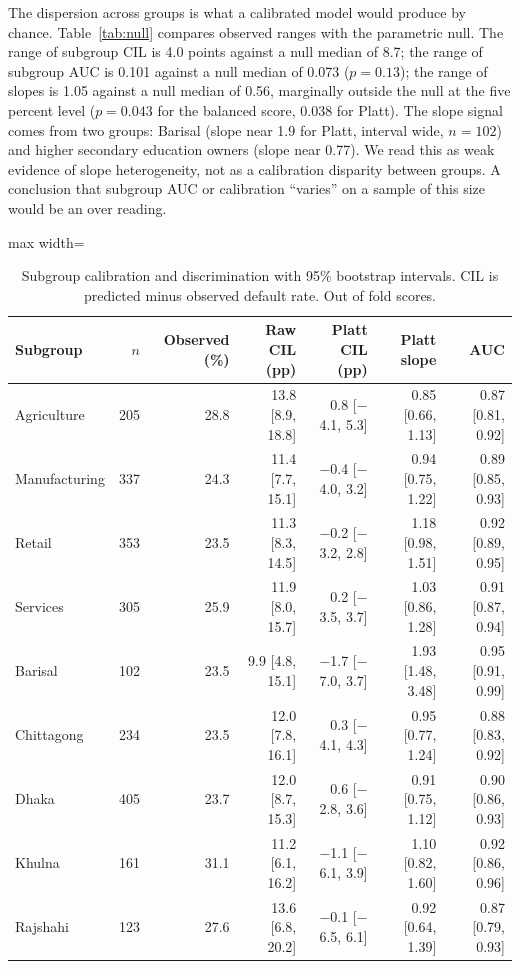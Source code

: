 \documentclass[11pt,a4paper]{article}
\newcommand{\tabsize}{\footnotesize}
\begin{document}
The dispersion across groups is what a calibrated model would produce by chance. Table~\ref{tab:null} compares observed ranges with the parametric null. The range of subgroup CIL is 4.0 points against a null median of 8.7; the range of subgroup AUC is 0.101 against a null median of 0.073 ($p=0.13$); the range of slopes is 1.05 against a null median of 0.56, marginally outside the null at the five percent level ($p=0.043$ for the balanced score, 0.038 for Platt). The slope signal comes from two groups: Barisal (slope near 1.9 for Platt, interval wide, $n=102$) and higher secondary education owners (slope near 0.77). We read this as weak evidence of slope heterogeneity, not as a calibration disparity between groups. A conclusion that subgroup AUC or calibration ``varies'' on a sample of this size would be an over reading.
\begin{table}[H]\centering\tabsize\setlength{\tabcolsep}{3pt}\caption{Subgroup calibration and discrimination with 95\% bootstrap intervals. CIL is predicted minus observed default rate. Out of fold scores.}\label{tab:sub}
\begin{adjustbox}{max width=\textwidth}
\begin{tabular}{lrrrrrr}
\toprule
Subgroup & $n$ & Observed (\%) & Raw CIL (pp) & Platt CIL (pp) & Platt slope & AUC \\
\midrule
Agriculture & 205 & 28.8 & 13.8 [8.9, 18.8] & 0.8 [$-$4.1, 5.3] & 0.85 [0.66, 1.13] & 0.87 [0.81, 0.92] \\
Manufacturing & 337 & 24.3 & 11.4 [7.7, 15.1] & $-$0.4 [$-$4.0, 3.2] & 0.94 [0.75, 1.22] & 0.89 [0.85, 0.93] \\
Retail & 353 & 23.5 & 11.3 [8.3, 14.5] & $-$0.2 [$-$3.2, 2.8] & 1.18 [0.98, 1.51] & 0.92 [0.89, 0.95] \\
Services & 305 & 25.9 & 11.9 [8.0, 15.7] & 0.2 [$-$3.5, 3.7] & 1.03 [0.86, 1.28] & 0.91 [0.87, 0.94] \\
\midrule
Barisal & 102 & 23.5 & 9.9 [4.8, 15.1] & $-$1.7 [$-$7.0, 3.7] & 1.93 [1.48, 3.48] & 0.95 [0.91, 0.99] \\
Chittagong & 234 & 23.5 & 12.0 [7.8, 16.1] & 0.3 [$-$4.1, 4.3] & 0.95 [0.77, 1.24] & 0.88 [0.83, 0.92] \\
Dhaka & 405 & 23.7 & 12.0 [8.7, 15.3] & 0.6 [$-$2.8, 3.6] & 0.91 [0.75, 1.12] & 0.90 [0.86, 0.93] \\
Khulna & 161 & 31.1 & 11.2 [6.1, 16.2] & $-$1.1 [$-$6.1, 3.9] & 1.10 [0.82, 1.60] & 0.92 [0.86, 0.96] \\
Rajshahi & 123 & 27.6 & 13.6 [6.8, 20.2] & $-$0.1 [$-$6.5, 6.1] & 0.92 [0.64, 1.39] & 0.87 [0.79, 0.93] \\

\end{tabular}
\end{adjustbox}
\end{table}
\end{document}
